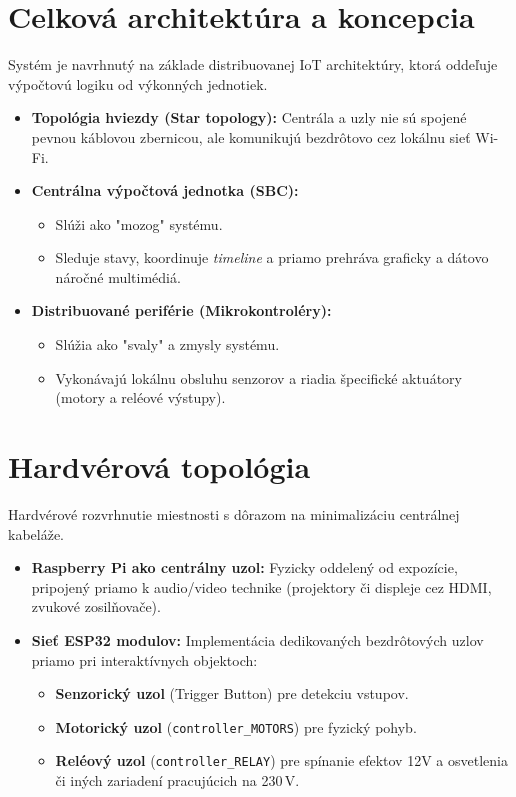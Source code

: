 \section{Celková architektúra a koncepcia}
\label{CelkovaArchitektura}

Systém je navrhnutý na základe distribuovanej IoT architektúry, ktorá oddeľuje výpočtovú logiku od výkonných jednotiek.

\begin{itemize}
    \item \textbf{Topológia hviezdy (Star topology):} Centrála a uzly nie sú spojené pevnou káblovou zbernicou, ale komunikujú bezdrôtovo cez lokálnu sieť Wi-Fi.
    \item \textbf{Centrálna výpočtová jednotka (SBC):} 
    \begin{itemize}
        \item Slúži ako "mozog" systému.
        \item Sleduje stavy, koordinuje \textit{timeline} a priamo prehráva graficky a dátovo náročné multimédiá.
    \end{itemize}
    \item \textbf{Distribuované periférie (Mikrokontroléry):} 
    \begin{itemize}
        \item Slúžia ako "svaly" a zmysly systému.
        \item Vykonávajú lokálnu obsluhu senzorov a riadia špecifické aktuátory (motory a reléové výstupy).
    \end{itemize}
\end{itemize}

\section{Hardvérová topológia}
\label{HardverovaTopoligia}

Hardvérové rozvrhnutie miestnosti s dôrazom na minimalizáciu centrálnej kabeláže.

\begin{itemize}
    \item \textbf{Raspberry Pi ako centrálny uzol:} Fyzicky oddelený od expozície, pripojený priamo k audio/video technike (projektory či displeje cez HDMI, zvukové zosilňovače).
    \item \textbf{Sieť ESP32 modulov:} Implementácia dedikovaných bezdrôtových uzlov priamo pri interaktívnych objektoch:
    \begin{itemize}
        \item \textbf{Senzorický uzol} (Trigger Button) pre detekciu vstupov.
        \item \textbf{Motorický uzol} (\texttt{controller\_MOTORS}) pre fyzický pohyb.
        \item \textbf{Reléový uzol} (\texttt{controller\_RELAY}) pre spínanie efektov 12V a osvetlenia či iných zariadení pracujúcich na 230\,V.
    \end{itemize}
\end{itemize}

